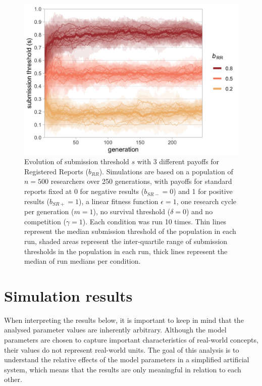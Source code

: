 \documentclass[
  ,man,mask,floatsintext]{apa6}
\begin{document}
\begin{figure}

{\centering \includegraphics[width=5.04in]{plots/plot_evo} 

}

\caption{Evolution of submission threshold \(s\) with 3 different payoffs for Registered Reports (\(b_{RR}\)). Simulations are based on a population of \(n = 500\) researchers over 250 generations, with payoffs for standard reports fixed at 0 for negative results (\(b_{SR-} = 0\)) and 1 for positive results (\(b_{SR+} = 1\)), a linear fitness function \(\epsilon = 1\), one research cycle per generation (\(m = 1\)), no survival threshold (\(\delta = 0\)) and no competition (\(\gamma = 1\)). Each condition was run 10 times. Thin lines represent the median submission threshold of the population in each run, shaded areas represent the inter-quartile range of submission thresholds in the population in each run, thick lines represent the median of run medians per condition.}\label{fig:evoplot}
\end{figure}

\hypertarget{simulation-results}{%
\section{Simulation results}\label{simulation-results}}

When interpreting the results below, it is important to keep in mind that the analysed parameter values are inherently arbitrary.
Although the model parameters are chosen to capture important characteristics of real-world concepts, their values do not represent real-world units.
The goal of this analysis is to understand the relative effects of the model parameters in a simplified artificial system, which means that the results are only meaningful in relation to each other.
\end{document}
